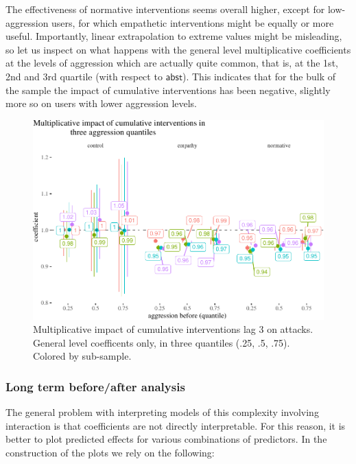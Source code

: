 \documentclass[preprint,12pt]{elsarticle}
\begin{document}
\normalsize

The effectiveness of normative interventions seems overall higher, except
for low-aggression users, for which empathetic interventions might be
equally or more useful. Importantly, linear extrapolation to extreme
values might be misleading, so let us inspect on what happens with the
general level multiplicative coefficients at the levels of aggression
which are actually quite common, that is, at the 1st, 2nd and 3rd
quartile (with respect to \(\mathsf{abst}\)). This indicates that for
the bulk of the sample the impact of cumulative interventions has been
negative, slightly more so on users with lower aggression levels.






\begin{figure}

\begin{center}\includegraphics[width=1\linewidth]{ figures/fig:cumulativeResultsGeenralPlot-1} \end{center}
\caption{Multiplicative impact of cumulative interventions lag 3 on attacks. General level coefficents only, in three quantiles (.25, .5, .75). Colored by sub-sample.}
\label{fig:cumulativeResultsGeneralPlot}
\end{figure}


\subsubsection{Long term before/after
analysis}\label{subsubsec:long-term-beforeafter-analysis}

The general problem with interpreting  models of this complexity involving
interaction is  that coefficients are not directly interpretable. For this reason, it is better
to plot predicted effects for various combinations of predictors. In the
construction of the plots we rely on the following:
\end{document}
